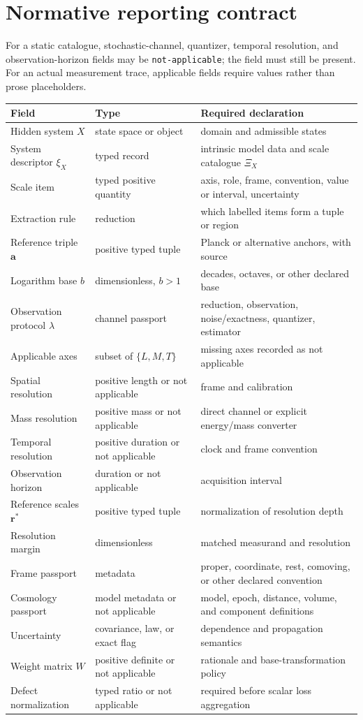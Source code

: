 \documentclass[11pt,a4paper]{article}
\theoremstyle{definition}
\theoremstyle{plain}
\theoremstyle{remark}
\begin{document}
\section{Normative reporting contract}

For a static catalogue, stochastic-channel, quantizer, temporal
resolution, and observation-horizon fields may be
\texttt{not-applicable}; the field must still be present. For an actual
measurement trace, applicable fields require values rather than prose
placeholders.

\begin{longtable}{L{0.23\textwidth}L{0.20\textwidth}L{0.47\textwidth}}
\toprule
Field & Type & Required declaration\\
\midrule
\endhead
Hidden system $X$ & state space or object & domain and admissible states\\
System descriptor $\xi_X$ & typed record & intrinsic model data and
scale catalogue $\Xi_X$\\
Scale item & typed positive quantity & axis, role, frame, convention,
value or interval, uncertainty\\
Extraction rule & reduction & which labelled items form a tuple or
region\\
Reference triple $\bm a$ & positive typed tuple & Planck or alternative
anchors, with source\\
Logarithm base $b$ & dimensionless, $b>1$ & decades, octaves, or other
declared base\\
Observation protocol $\lambda$ & channel passport & reduction,
observation, noise/exactness, quantizer, estimator\\
Applicable axes & subset of $\{L,M,T\}$ & missing axes recorded as
not applicable\\
Spatial resolution & positive length or not applicable & frame and
calibration\\
Mass resolution & positive mass or not applicable & direct channel or
explicit energy/mass converter\\
Temporal resolution & positive duration or not applicable & clock and
frame convention\\
Observation horizon & duration or not applicable & acquisition interval\\
Reference scales $\bm r^*$ & positive typed tuple & normalization of
resolution depth\\
Resolution margin & dimensionless & matched measurand and resolution\\
Frame passport & metadata & proper, coordinate, rest, comoving, or other
declared convention\\
Cosmology passport & model metadata or not applicable & model, epoch,
distance, volume, and component definitions\\
Uncertainty & covariance, law, or exact flag & dependence and propagation
semantics\\
Weight matrix $W$ & positive definite or not applicable & rationale and
base-transformation policy\\
Defect normalization & typed ratio or not applicable & required before
scalar loss aggregation\\
\bottomrule
\end{longtable}
\end{document}
